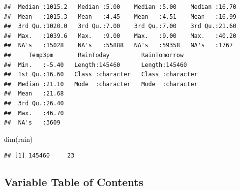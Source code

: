 \documentclass[
]{article}
\newenvironment{Shaded}{\begin{snugshade}}{\end{snugshade}}
\newcommand{\FunctionTok}[1]{\textcolor[rgb]{0.00,0.00,0.00}{#1}}
\newcommand{\NormalTok}[1]{#1}
\begin{document}
\begin{verbatim}
##  Median :1015.2   Median :5.00    Median :5.00    Median :16.70  
##  Mean   :1015.3   Mean   :4.45    Mean   :4.51    Mean   :16.99  
##  3rd Qu.:1020.0   3rd Qu.:7.00    3rd Qu.:7.00    3rd Qu.:21.60  
##  Max.   :1039.6   Max.   :9.00    Max.   :9.00    Max.   :40.20  
##  NA's   :15028    NA's   :55888   NA's   :59358   NA's   :1767   
##     Temp3pm       RainToday         RainTomorrow      
##  Min.   :-5.40   Length:145460      Length:145460     
##  1st Qu.:16.60   Class :character   Class :character  
##  Median :21.10   Mode  :character   Mode  :character  
##  Mean   :21.68                                        
##  3rd Qu.:26.40                                        
##  Max.   :46.70                                        
##  NA's   :3609
\end{verbatim}

\begin{Shaded}
\begin{Highlighting}[]
\FunctionTok{dim}\NormalTok{(rain)}
\end{Highlighting}
\end{Shaded}

\begin{verbatim}
## [1] 145460     23
\end{verbatim}

\hypertarget{variable-table-of-contents}{%
\subsection{Variable Table of
Contents}\label{variable-table-of-contents}}
\end{document}
